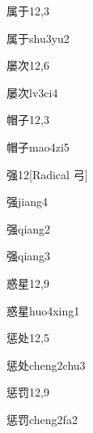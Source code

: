 \begin{entry}{属于}{12,3}
  \begin{phonetics}{属于}{shu3yu2}
  \end{phonetics}
\end{entry}

\begin{entry}{屡次}{12,6}
  \begin{phonetics}{屡次}{lv3ci4}
  \end{phonetics}
\end{entry}

\begin{entry}{帽子}{12,3}
  \begin{phonetics}{帽子}{mao4zi5}
  \end{phonetics}
\end{entry}

\begin{entry}{强}{12}[Radical 弓]
  \begin{phonetics}{强}{jiang4}
  \end{phonetics}
  \begin{phonetics}{强}{qiang2}
  \end{phonetics}
  \begin{phonetics}{强}{qiang3}
  \end{phonetics}
\end{entry}

\begin{entry}{惑星}{12,9}
  \begin{phonetics}{惑星}{huo4xing1}
  \end{phonetics}
\end{entry}

\begin{entry}{惩处}{12,5}
  \begin{phonetics}{惩处}{cheng2chu3}
  \end{phonetics}
\end{entry}

\begin{entry}{惩罚}{12,9}
  \begin{phonetics}{惩罚}{cheng2fa2}
  \end{phonetics}
\end{entry}

